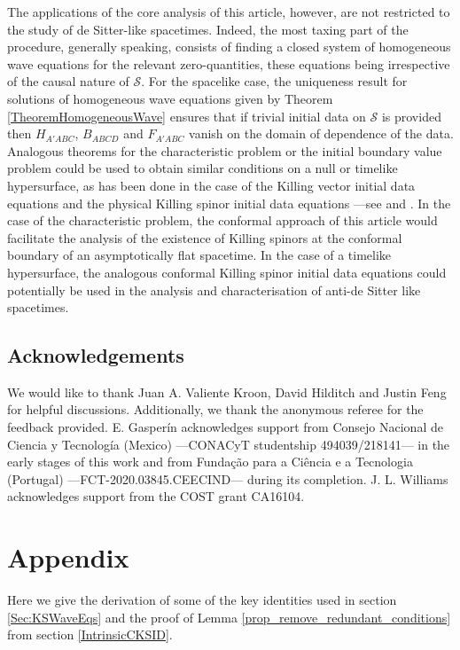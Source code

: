 \documentclass[10pt,a4paper]{article}
\theoremstyle{plain}
\begin{document}
The applications of the core analysis of this article, however, are
not restricted to the study of de Sitter-like spacetimes. Indeed, the
most taxing part of the procedure, generally speaking, consists of finding a closed system
of homogeneous wave equations for the relevant zero-quantities, these equations being irrespective of the causal nature
of $\mathcal{S}$. For the spacelike case, the uniqueness result for solutions of homogeneous wave equations given by Theorem \ref{TheoremHomogeneousWave} ensures that if
trivial initial data on $\mathcal{S}$ is provided then $H_{A'ABC}$,
$B_{ABCD}$ and $F_{A'ABC}$ vanish on the domain of dependence of the
data.  Analogous theorems for the characteristic problem or the
initial boundary value problem could be used to obtain similar
conditions on a null or timelike hypersurface, as has been done in the
case of the Killing vector initial data equations and the physical
Killing spinor initial data equations ---see \cite{Pae14a,
  ColRacVal18} and \cite{CarVal18}.  In the case of the characteristic
problem, the conformal approach of this article would facilitate the
analysis of the existence of Killing spinors at the conformal boundary
of an asymptotically flat spacetime.  In the case of a timelike
hypersurface, the analogous conformal Killing spinor initial data
equations could potentially be used in the analysis and characterisation of
anti-de Sitter like spacetimes.


\subsection*{Acknowledgements}

We would like to thank Juan A. Valiente Kroon, David Hilditch and
Justin Feng for helpful discussions. Additionally, we thank the
anonymous referee for the feedback provided.
E. Gasper\'in acknowledges support from Consejo Nacional de
Ciencia y Tecnolog\'ia (Mexico) ---CONACyT studentship
494039/218141--- in the early stages of this work and from Fundaç\~ao
para a Ci\^encia e a Tecnologia (Portugal)
---FCT-2020.03845.CEECIND--- during its completion. J. L. Williams
acknowledges support from the COST grant CA16104.  \appendix

\section{Appendix}\label{Appendix_A}

Here we give the derivation of some of the key identities used in
section \ref{Sec:KSWaveEqs} and the proof of Lemma
\ref{prop_remove_redundant_conditions} from section
\ref{IntrinsicCKSID}.
\end{document}
